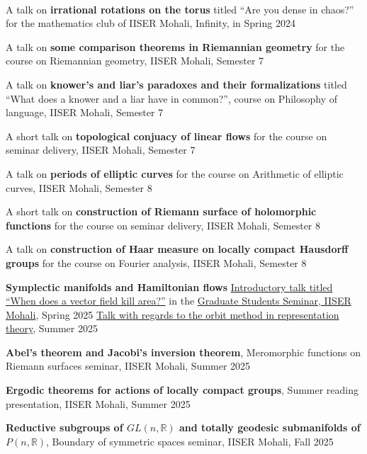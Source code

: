 \documentclass{LoLaTeXcv}
\begin{document}
\

\begin{lltxItemize}
	\item A talk on \textbf{irrational rotations on the torus} titled ``Are you dense in chaos?'' for the mathematics club of IISER Mohali, Infinity, in Spring 2024
	\item A talk on \textbf{some comparison theorems in Riemannian geometry} for the course on Riemannian geometry, IISER Mohali, Semester 7
	\item A talk on \textbf{knower's and liar's paradoxes and their formalizations} titled ``What does a knower and a liar have in common?'', course on Philosophy of language, IISER Mohali, Semester 7
	\item A short talk on \textbf{topological conjuacy of linear flows} for the course on seminar delivery, IISER Mohali, Semester 7
	\item A talk on \textbf{periods of elliptic curves} for the course on Arithmetic of elliptic curves, IISER Mohali, Semester 8
	\item A short talk on \textbf{construction of Riemann surface of holomorphic functions} for the course on seminar delivery, IISER Mohali, Semester 8
	\item A talk on \textbf{construction of Haar measure on locally compact Hausdorff groups} for the course on Fourier analysis, IISER Mohali, Semester 8
	\item \textbf{Symplectic manifolds and Hamiltonian flows}
		\subitem \href{https://ggl.link/hamiltonian}{Introductory talk titled ``When
		does a vector field kill area?''} in the \href{https://web.iisermohali.ac.in/dept/math/seminars/gsg/}{Graduate Students Seminar, IISER Mohali}, Spring 2025
		\subitem \href{https://dub.sh/qofhamil}{Talk with regards to the orbit method in representation theory}, Summer 2025
	\item \textbf{Abel's theorem and Jacobi's inversion theorem}, Meromorphic functions on Riemann surfaces seminar, IISER Mohali, Summer 2025
	\item \textbf{Ergodic theorems for actions of locally compact groups}, Summer reading presentation, IISER Mohali, Summer 2025
	\item \textbf{Reductive subgroups of $GL(n,\mathbb{R})$ and totally geodesic submanifolds of $P(n,\mathbb{R})$}, Boundary of symmetric spaces seminar, IISER Mohali, Fall 2025
\end{lltxItemize}
\end{document}

